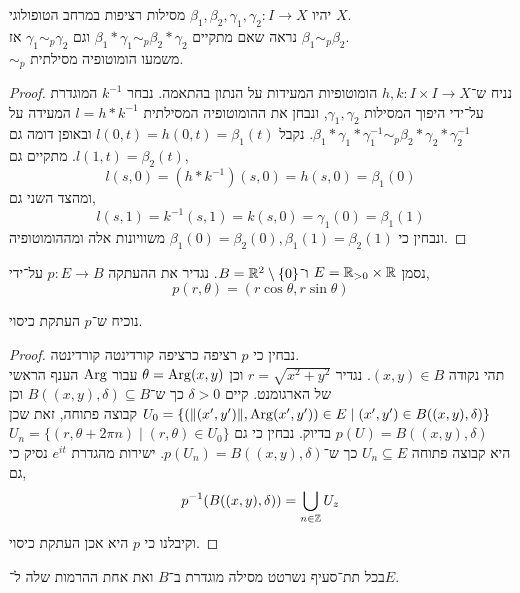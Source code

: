 \question{}
יהיו $\beta_1, \beta_2, \gamma_1, \gamma_2 : I \to X$ מסילות רציפות במרחב הטופולוגי $X$. \\
נראה שאם מתקיים $\beta_1 * \gamma_1 \sim_p \beta_2 * \gamma_2$ וגם $\gamma_1 \sim_p \gamma_2$ אז $\beta_1 \sim_p \beta_2$. \\
$\sim_p$ משמעו הומוטופיה מסילתית.
\begin{proof}
	נניח ש־$h, k : I \times I \to X$ הומוטופיות המעידות על הנתון בהתאמה.
	נבחר $k^{-1}$ המוגדרת על־ידי היפוך המסילות $\gamma_1, \gamma_2$, ונבחן את ההומוטופיה המסילתית $l = h * k^{-1}$ המעידה על $\beta_1 * \gamma_1 * \gamma_1^{-1} \sim_p \beta_2 * \gamma_2 * \gamma_2^{-1}$.
	נקבל $l(0, t) = h(0, t) = \beta_1(t)$ ובאופן דומה גם $l(1, t) = \beta_2(t)$.
	מתקיים גם,
	\[
		l(s, 0)
		= (h * k^{-1})(s, 0)
		= h(s, 0)
		= \beta_1(0)
	\]
	ומהצד השני גם,
	\[
		l(s, 1)
		= k^{-1}(s, 1)
		= k(s, 0)
		= \gamma_1(0)
		= \beta_1(1)
	\]
	ונבחין כי $\beta_1(0) = \beta_2(0), \beta_1(1) = \beta_2(1)$ משוויונות אלה ומההומוטופיה.
\end{proof}

\question{}
נסמן $E = \mathbb{R}_{> 0} \times \mathbb{R}$ ו־$B = \mathbb{R}^2 \setminus \{ 0 \}$.
נגדיר את ההעתקה $p : E \to B$ על־ידי,
\[
	p(r, \theta) = (r \cos \theta, r \sin \theta)
\]

\subquestion{}
נוכיח ש־$p$ העתקת כיסוי.
\begin{proof}
	נבחין כי $p$ רציפה כרציפה קורדינטה קורדינטה. \\
	תהי נקודה $(x, y) \in B$.
	נגדיר $r = \sqrt{x^2 + y^2}$ וכן $\theta = \operatorname{Arg} (x, y)$ עבור $\operatorname{Arg}$ הענף הראשי של הארגומנט.
	קיים $\delta > 0$ כך ש־$B((x, y), \delta) \subseteq B$ וכן $U_0 = \{ (\lVert (x', y') \rVert, \operatorname{Arg}(x', y')) \in E \mid (x', y') \in B((x, y), \delta) \}$ קבוצה פתוחה,
	זאת שכן $p(U) = B((x, y), \delta)$ בדיוק.
	נבחין כי גם $U_n = \{ (r, \theta + 2 \pi n) \mid (r, \theta) \in U_0 \}$ היא קבוצה פתוחה $U_n \subseteq E$ כך ש־$p(U_n) = B((x, y), \delta)$.
	ישירות מהגדרת $e^{it}$ נסיק כי גם,
	\[
		p^{-1}(B((x, y), \delta))
		= \bigcup_{n \in \mathbb{Z}} U_z
	\]
	וקיבלנו כי $p$ היא אכן העתקת כיסוי.
\end{proof}

\subquestion{}
בכל תת־סעיף נשרטט מסילה מוגדרת ב־$B$ ואת אחת ההרמות שלה ל־$E$.

